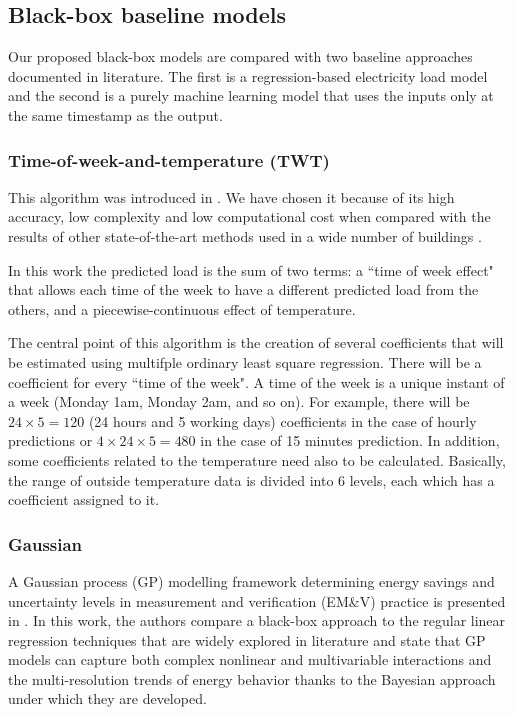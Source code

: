 \documentclass[10pt, conference, compsocconf]{IEEEtran}
\begin{document}
\subsection{Black-box baseline models}

Our proposed black-box models are compared with two baseline approaches documented in literature. The first is a regression-based electricity load model and the second is a purely machine learning model that uses the inputs only at the same timestamp as the output.


\subsubsection{Time-of-week-and-temperature (TWT)}

This algorithm was introduced in \cite{mathieu2011quantifying}. We have chosen it because of its high accuracy, low complexity and low computational cost when compared with the results of other state-of-the-art methods used in a wide number of buildings \cite{granderson2016accuracy}. 

In this work the predicted load is the sum of two terms: a ``time of week effect" that allows each time of the week to have a different predicted load from the others, and a piecewise-continuous effect of temperature. 

The central point of this algorithm is the creation of several coefficients that will be estimated using multifple ordinary least square regression. There will be a coefficient for every ``time of the week". A time of the week is a unique instant of a week (Monday 1am, Monday 2am, and so on). For example, there will be $24 \times 5 = 120$ (24 hours and 5 working days) coefficients in the case of hourly predictions or  $4\times 24 \times 5 = 480$ in the case of 15 minutes prediction. In addition, some coefficients related to the temperature need also to be calculated. Basically, the range of outside temperature data is divided into 6 levels, each which has a coefficient assigned to it.

\subsubsection{Gaussian}

A Gaussian process (GP) modelling framework determining energy savings and uncertainty levels in measurement and verification (EM\&V) practice is presented in \cite{heo2012gaussian}.  In this work, the authors compare a black-box approach to the regular linear regression techniques that are widely explored in literature and state that GP models can capture both complex nonlinear and multivariable interactions and the multi-resolution trends of energy behavior thanks to the Bayesian approach under which they are developed. 
\end{document}

